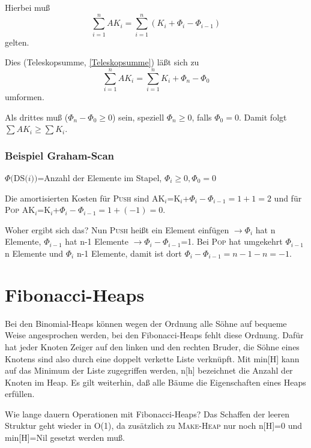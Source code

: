 Hierbei muß \[\sum_{i=1}^n AK_i=\sum_{i=1}^n (K_i+{\Phi}_i-{\Phi}_{i-1})\] gelten.

Dies (Teleskopsumme, \autoref{Teleskopsumme}) läßt sich zu \[\sum_{i=1}^n AK_i=\sum_{i=1}^n
K_i+{\Phi}_n-{\Phi}_0\] umformen.

Als drittes muß (${\Phi}_n-{\Phi}_0 \geq 0$) sein, speziell ${\Phi}_n \geq 0$, falls ${\Phi}_0=0$. Damit folgt
$\sum AK_i \geq \sum K_i$.

\subsubsection{Beispiel Graham-Scan}

\begin{definition}
$\Phi \mbox{(DS(}i\mbox{))}$=Anzahl der Elemente im Stapel, ${\Phi}_i \geq 0, {\Phi}_0=0$
\end{definition}

Die amortisierten Kosten für  \textsc{Push} sind AK$_i$=K$_i$+${\Phi}_i-{\Phi}_{i-1}=1+1=2$
und für  \textsc{Pop} AK$_i$=K$_i$+${\Phi}_i-{\Phi}_{i-1}=1+(-1)=0$.

Woher ergibt sich das? Nun \textsc{Push} heißt ein Element einfügen $\rightarrow {\Phi}_i$ hat n Elemente,
${\Phi}_{i-1}$
 hat n-1 Elemente $ \rightarrow {\Phi}_i-{\Phi}_{i-1}$=1. Bei \textsc{Pop} hat umgekehrt ${\Phi}_{i-1}$ n Elemente und
 ${\Phi}_i $ n-1
Elemente, damit ist dort ${\Phi}_i-{\Phi}_{i-1}=n-1-n=-1$.  

\section{Fibonacci-Heaps}
Bei den Binomial-Heaps können wegen der Ordnung alle Söhne auf bequeme Weise angesprochen werden, bei den
Fibonacci-Heaps fehlt diese Ordnung. Dafür hat jeder Knoten Zeiger auf den linken und den rechten Bruder, die Söhne
eines Knotens sind also durch eine doppelt verkette Liste verknüpft. Mit min[H] kann auf das Minimum der Liste
zugegriffen werden, n[h] bezeichnet die Anzahl der Knoten im Heap. Es gilt weiterhin, daß alle Bäume die
Eigenschaften eines Heaps erfüllen.

Wie lange dauern Operationen mit Fibonacci-Heaps? Das Schaffen der leeren Struktur geht wieder in O(1), da zusätzlich
zu \textsc{Make-Heap} nur noch n[H]=0 und min[H]=Nil gesetzt werden muß.

